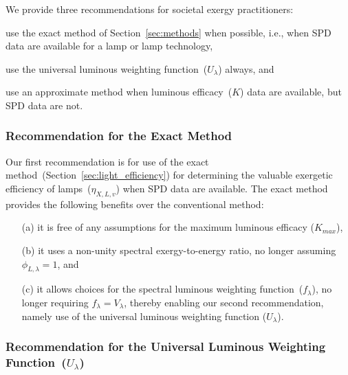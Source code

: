 \documentclass[energies,article,accept,moreauthors,pdftex]{Definitions/mdpi}\usepackage[]{graphicx}\usepackage[]{color}
\begin{document}
We provide three recommendations for societal exergy practitioners:
%
\begin{enumerate*}[label={(\alph*)}]

  \item use the exact method of Section~\ref{sec:methods} when possible, 
        i.e., when SPD data are available for a lamp or lamp technology, 

  \item use the universal luminous weighting function~($U_\lambda$) always, and

  \item use an approximate method when luminous efficacy~($K$) data are available, but
        SPD data are not.

\end{enumerate*}


\subsubsection{Recommendation for the Exact Method} 
\label{sec:recommend_exact_method}

Our first recommendation is for use of the 
exact method~(Section~\ref{sec:light_efficiency})
for determining the valuable exergetic efficiency of lamps~($\eta_{X,L,v}$)
when SPD data are available.
The exact method provides the following benefits over the conventional method:
%
\begin{enumerate}[leftmargin=8mm,labelsep=3mm] 


  \item[(a)] it is free of any assumptions for the maximum luminous efficacy ($K_{max}$),

  \item[(b)] it uses a non-unity spectral exergy-to-energy ratio, no longer assuming $\phi_{L,\lambda} = 1$, and 

  \item[(c)] it allows choices for the spectral luminous weighting function~($f_\lambda$), 
        no longer requiring $f_\lambda = V_\lambda$, 
        thereby enabling our second recommendation, 
        namely use of the universal luminous weighting function ($U_\lambda$).

\end{enumerate}


\subsubsection{Recommendation for the Universal Luminous Weighting Function~($U_\lambda$)} 
\label{sec:reccuniv}
\end{document}
